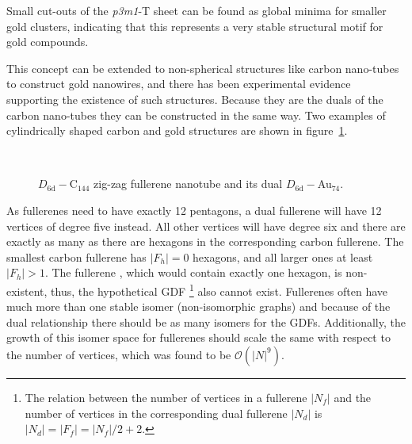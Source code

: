 Small cut-outs of the \textit{p3m1}-T sheet can be found as global minima for smaller
gold clusters, indicating that this represents a very stable structural motif
for gold compounds.\autocite{Assadollahzadeh_systematicsearchminimum_2009}

This concept can be extended to non-spherical structures like carbon nano-tubes
to construct gold nanowires, and there has been experimental evidence
supporting the existence of such structures\autocite{Kondo-2000}. Because they
are the duals of the carbon nano-tubes they can be constructed in the same
way.\autocite{Dresselhaus-1992} Two examples of cylindrically shaped carbon and gold structures are shown in figure~\ref{fig:nanotubedual}.

\begin{figure}[htb]
    \begin{center}
         \\
        \caption{\protect{} $D_\mathrm{6d}-$C$_{144}$ zig-zag
        fullerene nanotube and \protect{} its dual
        $D_\mathrm{6d}-$Au$_{74}$.}
    \label{fig:nanotubedual}
    \end{center}
\end{figure}

As fullerenes need to have exactly 12 pentagons, a dual fullerene will have 12
vertices of degree five instead. All other vertices will have degree six and
there are exactly as many as there are hexagons in the corresponding carbon
fullerene. The smallest carbon fullerene  has $|F_h|=0$ hexagons, and
all larger ones at least $|F_h|>1$. The fullerene , which would contain
exactly one hexagon, is
non-existent,\autocite{Grunbaum_numberhexagonssimplicity_1963} thus, the
hypothetical \ac{GDF} \footnote{The relation between the
number of vertices in a fullerene $|N_f|$ and the number of vertices in the
corresponding dual fullerene $|N_d|$ is
$|N_d|=|F_f|=|N_f|/2+2$.\autocite{Schwerdtfeger_topologyfullerenes_2015}} also
cannot exist. Fullerenes often have much more than one stable isomer
(non-isomorphic graphs)\autocite{Fowler-atlas-2006} and because of the dual
relationship there should be as many isomers for the \acp{GDF}.
Additionally, the growth of this isomer space for fullerenes should scale the same with respect
to the number of vertices, which was found to be
$\mathcal{O}\left({|N|}^9\right)$.\autocite{Thurston_Shapespolyhedratriangulations_1998}

